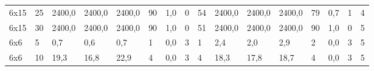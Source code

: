 \begin{table}[]
\begin{tabular}{llllllllllllllll}
		6x15    & 25     & 2400,0                                              & 2400,0                                              & 2400,0                                              & 90                                                  & 1,0                                                 & 0      & 54                                                        & 2400,0                                              & 2400,0                                              & 2400,0                                              & 79                                                  & 0,7                                                 & 1      & 4                                                         \\
		6x15    & 30     & 2400,0                                              & 2400,0                                              & 2400,0                                              & 90                                                  & 1,0                                                 & 0      & 51                                                        & 2400,0                                              & 2400,0                                              & 2400,0                                              & 90                                                  & 1,0                                                 & 0      & 5                                                         \\
		6x6     & 5      & 0,7                                                 & 0,6                                                 & 0,7                                                 & 1                                                   & 0,0                                                 & 3      & 1                                                         & 2,4                                                 & 2,0                                                 & 2,9                                                 & 2                                                   & 0,0                                                 & 3      & 5                                                         \\
		6x6     & 10     & 19,3                                                & 16,8                                                & 22,9                                                & 4                                                   & 0,0                                                 & 3      & 4                                                         & 18,3                                                & 17,8                                                & 18,7                                                & 4                                                   & 0,0                                                 & 3      & 5                                                         \\

\end{tabular}
\end{table}
